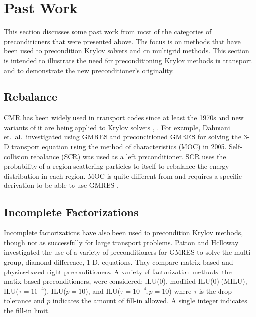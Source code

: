 \section{Past Work}
This section discusses some past work from most of the categories of preconditioners that were presented above. The focus is on methods that have been used to precondition Krylov solvers and on multigrid methods. This section is intended to illustrate the need for preconditioning Krylov methods in transport and to demonstrate the new preconditioner's originality. 

\subsection{Rebalance}
CMR has been widely used in transport codes since at least the 1970s and new variants of it are being applied to Krylov solvers \cite{Dahmani2002}, \cite{Yamamoto2005}. For example, Dahmani et.\ al.\ investigated using GMRES and preconditioned GMRES for solving the 3-D transport equation using the method of characteristics (MOC) in 2005. Self-collision rebalance (SCR) was used as a left preconditioner. SCR uses the probability of a region scattering particles to itself to rebalance the energy distribution in each region. MOC is quite different from \Sn and requires a specific derivation to be able to use GMRES \cite{Dahmani2002}. 

\subsection{Incomplete Factorizations}
Incomplete factorizations have also been used to precondition Krylov methods, though not as successfully for large transport problems. Patton and Holloway investigated the use of a variety of preconditioners for GMRES to solve the multi-group, diamond-difference, 1-D, \Sn equations. They compare matrix-based and physics-based right preconditioners. A variety of factorization methods, the matix-based preconditioners, were considered: ILU(0), modified ILU(0) (MILU), ILU($\tau=10^{-4}$), ILU($p=10$), and ILU($\tau=10^{-4}, p=10$) where $\tau$ is the drop tolerance and $p$ indicates the amount of fill-in allowed. A single integer indicates the fill-in limit. 

